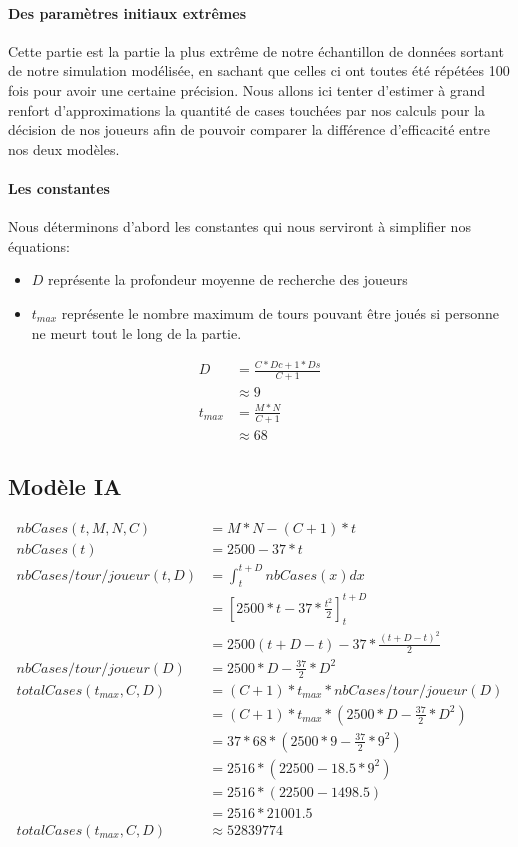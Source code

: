 		\paragraph{Des paramètres initiaux extrêmes}
		Cette partie est la partie la plus extrême de notre échantillon de données sortant de notre simulation modélisée, en sachant que celles ci ont toutes été répétées 100 fois pour avoir une certaine précision.
		Nous allons ici tenter d'estimer à grand renfort d'approximations la quantité de cases touchées par nos calculs pour la décision de nos joueurs afin de pouvoir comparer la différence d'efficacité entre nos deux modèles. 
		
		\paragraph{Les constantes}
		Nous déterminons d'abord les constantes qui nous serviront à simplifier nos équations:
		\begin{itemize}
			\item $D$ représente la profondeur moyenne de recherche des joueurs
			\item $t_{max}$ représente le nombre maximum de tours pouvant être joués si personne ne meurt tout le long de la partie.
		\end{itemize}
	
		
		\begin{align}
		D &= \frac{C*Dc+1*Ds}{C+1}\\
		&\approx 9 \\
		t_{max} &= \frac{M*N}{C+1}\\
		& \approx 68
		\end{align}
		
		\subsection{Modèle IA}
		
		
		
		\begin{align}
			nbCases(t, M, N, C) &= M*N-(C+1)*t\\
			nbCases(t) & = 2500 - 37 * t\\
			nbCases/tour/joueur(t, D) &= \int_{t}^{t+D} nbCases(x) dx\\
			&= [2500*t - 37*\frac{t^2}{2}]_{t}^{t+D}\\
			& = 2500(t+D-t) - 37*\frac{(t+D-t)^2}{2}\\
			nbCases/tour/joueur(D)& = 2500*D - \frac{37}{2}*D^2\\
			totalCases(t_{max}, C, D) &= (C+1)*t_{max}*nbCases/tour/joueur(D)\\
			&= (C+1)*t_{max}*(2500*D - \frac{37}{2}*D^2)\\
			&= 37*68 *(2500*9 - \frac{37}{2}*9^2)\\
			&= 2516 * (22500 - 18.5*9^2)\\
			&= 2516 * (22500 - 1498.5)\\
			&= 2516 * 21001.5\\
			totalCases(t_{max}, C, D) &\approx 52839774
		\end{align}
		
